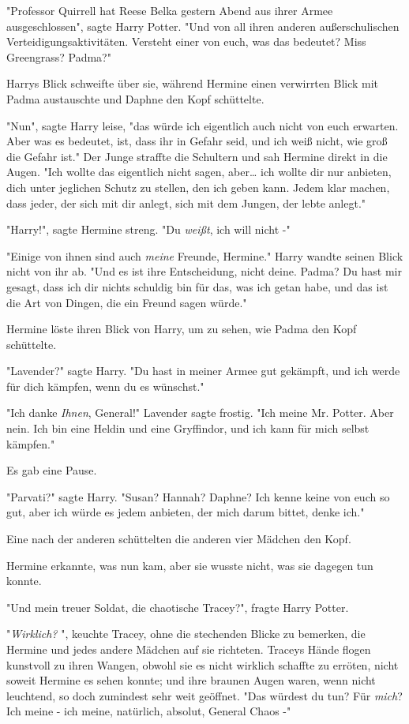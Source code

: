 {"Professor Quirrell hat Reese Belka gestern Abend aus ihrer Armee ausgeschlossen", sagte Harry Potter. "Und von all ihren anderen außerschulischen Verteidigungsaktivitäten. Versteht einer von euch, was das bedeutet? Miss Greengrass? Padma?"

Harrys Blick schweifte über sie, während Hermine einen verwirrten Blick mit Padma austauschte und Daphne den Kopf schüttelte.

"Nun", sagte Harry leise, "das würde ich eigentlich auch nicht von euch erwarten. Aber was es bedeutet, ist, dass ihr in Gefahr seid, und ich weiß nicht, wie groß die Gefahr ist." Der Junge straffte die Schultern und sah Hermine direkt in die Augen. "Ich wollte das eigentlich nicht sagen, aber… ich wollte dir nur anbieten, dich unter jeglichen Schutz zu stellen, den ich geben kann. Jedem klar machen, dass jeder, der sich mit dir anlegt, sich mit dem Jungen, der lebte anlegt."

"Harry!", sagte Hermine streng. "Du \emph{weißt}, ich will nicht -"

"Einige von ihnen sind auch \emph{meine} Freunde, Hermine." Harry wandte seinen Blick nicht von ihr ab. "Und es ist ihre Entscheidung, nicht deine. Padma? Du hast mir gesagt, dass ich dir nichts schuldig bin für das, was ich getan habe, und das ist die Art von Dingen, die ein Freund sagen würde."

Hermine löste ihren Blick von Harry, um zu sehen, wie Padma den Kopf schüttelte.

"Lavender?" sagte Harry. "Du hast in meiner Armee gut gekämpft, und ich werde für dich kämpfen, wenn du es wünschst."

"Ich danke \emph{Ihnen}, General!" Lavender sagte frostig. "Ich meine Mr. Potter. Aber nein. Ich bin eine Heldin und eine Gryffindor, und ich kann für mich selbst kämpfen."

Es gab eine Pause.

"Parvati?" sagte Harry. "Susan? Hannah? Daphne? Ich kenne keine von euch so gut, aber ich würde es jedem anbieten, der mich darum bittet, denke ich."

Eine nach der anderen schüttelten die anderen vier Mädchen den Kopf.

Hermine erkannte, was nun kam, aber sie wusste nicht, was sie dagegen tun konnte.

"Und mein treuer Soldat, die chaotische Tracey?", fragte Harry Potter.

"\emph{Wirklich?} ", keuchte Tracey, ohne die stechenden Blicke zu bemerken, die Hermine und jedes andere Mädchen auf sie richteten. Traceys Hände flogen kunstvoll zu ihren Wangen, obwohl sie es nicht wirklich schaffte zu erröten, nicht soweit Hermine es sehen konnte; und ihre braunen Augen waren, wenn nicht leuchtend, so doch zumindest sehr weit geöffnet. "Das würdest du tun? Für \emph{mich}? Ich meine - ich meine, natürlich, absolut, General Chaos -"

}
